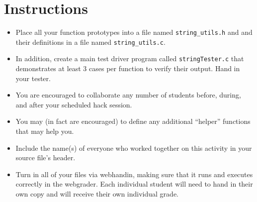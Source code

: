 \documentclass[12pt]{scrartcl}
\begin{document}
\section*{Instructions}

\begin{itemize}

  \item Place all your function prototypes into a file 
  named \texttt{string_utils.h} and and their definitions in a
  file named \texttt{string_utils.c}.  
  
  \item In addition, create a main test driver program called
  \texttt{stringTester.c} that demonstrates at least 3 cases 
  per function to verify their output.  Hand in your tester.
  
  \item You are encouraged to collaborate any number of students 
  before, during, and after your scheduled hack session.  

  \item You may (in fact are encouraged) to define any additional
  ``helper'' functions that may help you.
  
  \item Include the name(s) of everyone who worked together on
  this activity in your source file's header.

  \item Turn in all of your files via webhandin, making sure that 
  it runs and executes correctly in the webgrader.  Each individual 
  student will need to hand in their own copy and will receive 
  their own individual grade.

\end{itemize}  
\end{document}
